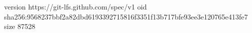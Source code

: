 version https://git-lfs.github.com/spec/v1
oid sha256:9568237bbf2a82dbd6193392715816f3351f13b717bfe93ee3e120765e413fe7
size 87528
